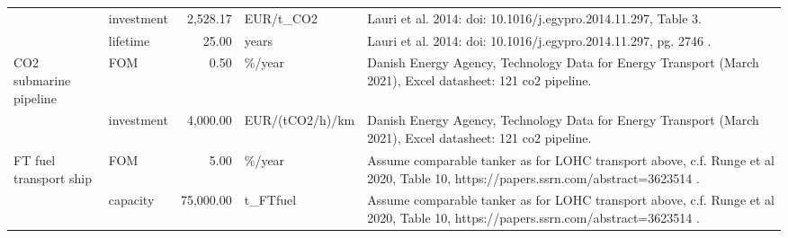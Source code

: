 \begin{longtable}{p{5cm}p{3cm}rp{3cm}p{11cm}}
                      & investment &       2,528.17 &                         EUR/t\_CO2 &                                                                                                                                                                                                                                                                       Lauri et al. 2014: doi: 10.1016/j.egypro.2014.11.297, Table 3. \\
                      & lifetime &          25.00 &                             years &                                                                                                                                                                                                                                                                     Lauri et al. 2014: doi: 10.1016/j.egypro.2014.11.297, pg. 2746 . \\
CO2 submarine pipeline & FOM &           0.50 &                            \%/year &                                                                                                                                                                                                                          Danish Energy Agency, Technology Data for Energy Transport (March 2021), Excel datasheet: 121 co2 pipeline. \\
                      & investment &       4,000.00 &                   EUR/(tCO2/h)/km &                                                                                                                                                                                                                          Danish Energy Agency, Technology Data for Energy Transport (March 2021), Excel datasheet: 121 co2 pipeline. \\
FT fuel transport ship & FOM &           5.00 &                            \%/year &                                                                                                                                                                                                    Assume comparable tanker as for LOHC transport above, c.f. Runge et al 2020, Table 10, https://papers.ssrn.com/abstract=3623514 . \\
                      & capacity &      75,000.00 &                          t\_FTfuel &                                                                                                                                                                                                    Assume comparable tanker as for LOHC transport above, c.f. Runge et al 2020, Table 10, https://papers.ssrn.com/abstract=3623514 . \\

\end{longtable}
